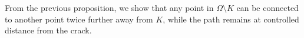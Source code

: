 \documentclass[12pt]{article}
\newtheorem{lemma}[theorem]{Lemma}
\theoremstyle{definition}
\theoremstyle{remark}
\numberwithin{equation}{section}
\DeclareMathOperator{\dist}{dist}
\newcommand{\R}{\mathbb{R}}
\newcommand{\N}{\mathbb{N}}
\begin{document}

From the previous proposition, we show that any point in $\Omega \setminus K$ can be connected to another point twice
further away from $K$, while the path remains at controlled distance from the crack.
\end{document}
